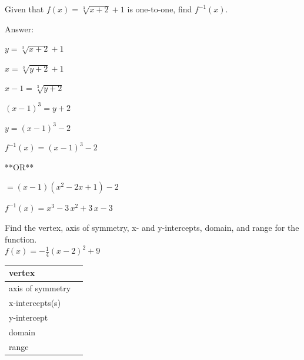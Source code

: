 \documentclass[11pt]{exam}
\begin{document}
\begin{questions}
\newpage

\question[5]
Given that \(\displaystyle{ f(x) = \sqrt[3]{x + 2} + 1 }\) is one-to-one, find \(f^{-1}(x)\).\\\vspace{12pt}

Answer: \fillin[][2in]
\begin{solution}
\(y = \sqrt[3]{x + 2} + 1\) 

 \(x = \sqrt[3]{y + 2} + 1\) 

 \(x - 1 = \sqrt[3]{y + 2}\) 

 \((x - 1)^3 = y + 2\) 

 \(y = (x - 1)^3 - 2\) 

 \(\boxed{ f^{-1}(x) = (x - 1)^3 - 2 }\) 

 **OR** 

 \(= (x - 1)(x^2 - 2x + 1) - 2\) 

 \(\boxed{ f^{-1}(x) = x^{3} - 3 \, x^{2} + 3 \, x - 3 }\)
\end{solution}

\label{exact-endocb}
\newpage

\headerbox{\occ}
\label{exact-startocc}

\question[5]
Find the vertex, axis of symmetry, x- and y-intercepts, domain, and range for the function.\\
 
 \(\displaystyle{ f(x) = -\frac{1}{4}(x - 2)^2 +9 }\)

\renewcommand{\arraystretch}{3}
	\begin{tabular}{|l|l|}
		\hline
		vertex           & \hspace{175px}  \\ \hline
		axis of symmetry &  \\ \hline
		x-intercepts(s)  &  \\ \hline
		y-intercept      &  \\ \hline
		domain           &  \\ \hline
		range            &  \\ \hline
	\end{tabular}
    

\end{questions}
\end{document}
